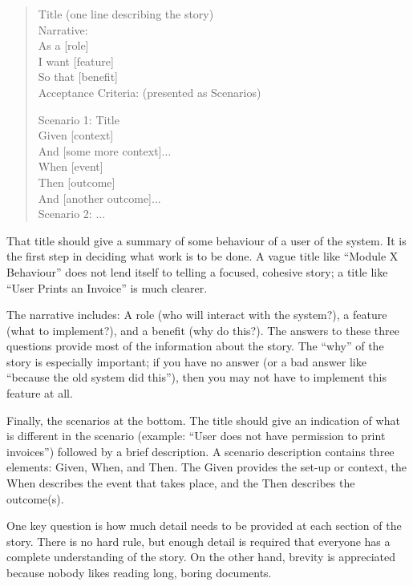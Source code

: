 \begin{quote}
Title (one line describing the story)\\

Narrative:\\
As a [role]\\
I want [feature]\\
So that [benefit]\\

Acceptance Criteria: (presented as Scenarios)

Scenario 1: Title\\
Given [context]\\
  And [some more context]...\\
When  [event]\\
Then  [outcome]\\
  And [another outcome]...\\

Scenario 2: ...
\end{quote}

That title should give a summary of some behaviour of a user of the system. It is the first step in deciding what work is to be done. A vague title like ``Module X Behaviour'' does not lend itself to telling a focused, cohesive story; a title like ``User Prints an Invoice'' is much clearer.

The narrative includes: A role (who will interact with the system?), a feature (what to implement?), and a benefit (why do this?). The answers to these three questions provide most of the information about the story. The ``why'' of the story is especially important; if you have no answer (or a bad answer like ``because the old system did this''), then you may not have to implement this feature at all.

Finally, the scenarios at the bottom. The title should give an indication of what is different in the scenario (example: ``User does not have permission to print invoices'') followed by a brief description. A scenario description contains three elements: Given, When, and Then. The Given provides the set-up or context, the When describes the event that takes place, and the Then describes the outcome(s). 

One key question is how much detail needs to be provided at each section of the story. There is no hard rule, but enough detail is required that everyone has a complete understanding of the story. On the other hand, brevity is appreciated because nobody likes reading long, boring documents.

